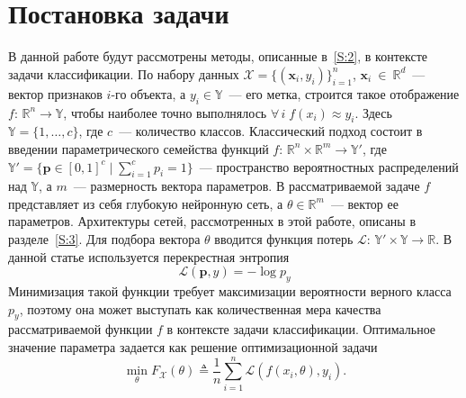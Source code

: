 \documentclass[preprint,12pt]{elsarticle}
\begin{document}
\section{Постановка задачи}
\label{S:1}
В данной работе будут рассмотрены методы, описанные в~\ref{S:2}, в контексте задачи классификации. По набору данных $\mathcal{X} = \{(\mathbf{x}_i, y_i)\}_{i=1}^n$, $\mathbf{x}_i~\in~\mathbb{R}^d$~--- вектор признаков $i$-го объекта, а $y_i \in \mathbb{Y}$~--- его метка, строится такое отображение $f\colon \, \mathbb{R}^n \rightarrow \mathbb{Y}$, чтобы наиболее точно выполнялось $\forall\, i \; f(x_i) \approx y_i$. 
Здесь $\mathbb{Y} = \{1, \dots, c\}$, где $c$~--- количество классов. 
Классический подход состоит в введении параметрического семейства функций $f\colon \, \mathbb{R}^n \times \mathbb{R}^m \rightarrow \mathbb{Y}'$, где $\mathbb{Y}' = \{\mathbf{p} \in [0, 1]^c \mid \sum_{i=1}^c p_i = 1\}$~--- пространство вероятностных распределений над $\mathbb{Y}$, а $m$~--- размерность вектора параметров. 
В рассматриваемой задаче $f$ представляет из себя глубокую нейронную сеть, а $\theta \in \mathbb{R}^m$~--- вектор ее параметров. Архитектуры сетей, рассмотренных в этой работе, описаны в разделе~\ref{S:3}.
Для подбора вектора $\theta$ вводится функция потерь $\mathcal{L}\colon \, \mathbb{Y}' \times \mathbb{Y} \rightarrow \mathbb{R}$. В данной статье используется перекрестная энтропия
\begin{equation} \label{eq-crossentropy}
    \mathcal{L}(\mathbf{p}, y) = -\log p_y
\end{equation}
Минимизация такой функции требует максимизации вероятности верного класса $p_y$, поэтому она может выступать как количественная мера качества рассматриваемой функции $f$ в контексте задачи классификации.
Оптимальное значение параметра задается как решение оптимизационной задачи
\begin{equation} \label{eq-opt-weight}
    \min_\theta F_\mathcal{X}(\theta) \triangleq \frac1n \sum_{i=1}^n \mathcal{L}(f(x_i, \theta), y_i).
\end{equation}
\end{document}
